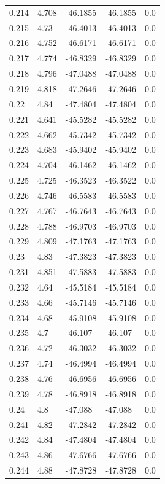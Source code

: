 \begin{table}[H]
\begin{tabular}{lllll}
0.214 & 4.708 & -46.1855 & -46.1855 & 0.0 \\
0.215 & 4.73 & -46.4013 & -46.4013 & 0.0 \\
0.216 & 4.752 & -46.6171 & -46.6171 & 0.0 \\
0.217 & 4.774 & -46.8329 & -46.8329 & 0.0 \\
0.218 & 4.796 & -47.0488 & -47.0488 & 0.0 \\
0.219 & 4.818 & -47.2646 & -47.2646 & 0.0 \\
0.22 & 4.84 & -47.4804 & -47.4804 & 0.0 \\
0.221 & 4.641 & -45.5282 & -45.5282 & 0.0 \\
0.222 & 4.662 & -45.7342 & -45.7342 & 0.0 \\
0.223 & 4.683 & -45.9402 & -45.9402 & 0.0 \\
0.224 & 4.704 & -46.1462 & -46.1462 & 0.0 \\
0.225 & 4.725 & -46.3523 & -46.3522 & 0.0 \\
0.226 & 4.746 & -46.5583 & -46.5583 & 0.0 \\
0.227 & 4.767 & -46.7643 & -46.7643 & 0.0 \\
0.228 & 4.788 & -46.9703 & -46.9703 & 0.0 \\
0.229 & 4.809 & -47.1763 & -47.1763 & 0.0 \\
0.23 & 4.83 & -47.3823 & -47.3823 & 0.0 \\
0.231 & 4.851 & -47.5883 & -47.5883 & 0.0 \\
0.232 & 4.64 & -45.5184 & -45.5184 & 0.0 \\
0.233 & 4.66 & -45.7146 & -45.7146 & 0.0 \\
0.234 & 4.68 & -45.9108 & -45.9108 & 0.0 \\
0.235 & 4.7 & -46.107 & -46.107 & 0.0 \\
0.236 & 4.72 & -46.3032 & -46.3032 & 0.0 \\
0.237 & 4.74 & -46.4994 & -46.4994 & 0.0 \\
0.238 & 4.76 & -46.6956 & -46.6956 & 0.0 \\
0.239 & 4.78 & -46.8918 & -46.8918 & 0.0 \\
0.24 & 4.8 & -47.088 & -47.088 & 0.0 \\
0.241 & 4.82 & -47.2842 & -47.2842 & 0.0 \\
0.242 & 4.84 & -47.4804 & -47.4804 & 0.0 \\
0.243 & 4.86 & -47.6766 & -47.6766 & 0.0 \\
0.244 & 4.88 & -47.8728 & -47.8728 & 0.0 \\

\end{tabular}
\end{table}
